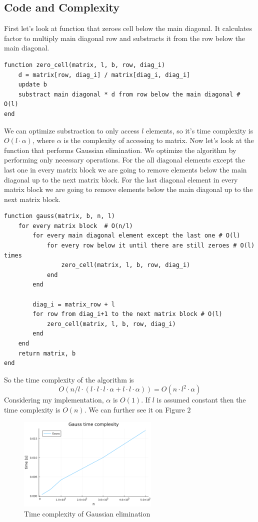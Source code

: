\documentclass[11pt]{article}
\begin{document}
\subsection*{Code and Complexity} 
First let's look at function that zeroes cell below the main diagonal.
It calculates factor to multiply main diagonal row and substracts it from the row below the main diagonal.
\begin{lstlisting}
function zero_cell(matrix, l, b, row, diag_i)
    d = matrix[row, diag_i] / matrix[diag_i, diag_i]
    update b
    substract main diagonal * d from row below the main diagonal # O(l)
end
\end{lstlisting}
We can optimize substraction to only access $l$ elements, so it's time complexity is $O(l \cdot \alpha)$, where $\alpha$ is the complexity of accessing to matrix.
\newline
Now let's look at the function that performs Gaussian elimination.
We optimize the algorithm by performing only necessary operations. 
For the all diagonal elements except the last one in every matrix block we are going to remove elements below the main diagonal up to the next matrix block.
For the last diagonal element in every matrix block we are going to remove elements below the main diagonal up to the next matrix block.
\begin{lstlisting}
function gauss(matrix, b, n, l)
    for every matrix block  # O(n/l)
        for every main diagonal element except the last one # O(l)
            for every row below it until there are still zeroes # O(l) times
                zero_cell(matrix, l, b, row, diag_i) 
            end
        end

        diag_i = matrix_row + l
        for row from diag_i+1 to the next matrix block # O(l)
            zero_cell(matrix, l, b, row, diag_i) 
        end
    end
    return matrix, b
end
\end{lstlisting}
So the time complexity of the algorithm is 
$$O(n/l \cdot ( l \cdot l \cdot l \cdot \alpha + l \cdot l \cdot \alpha )) = O(n \cdot l^2 \cdot \alpha )$$
Considering my implementation, $\alpha$ is $O(1)$.
If $l$ is assumed constant then the time complexity is $O(n)$. We can further see it on Figure $2$
\begin{figure}[h]
    \centering
    \includegraphics[width=0.6\textwidth]{gauss_time_complexity.png}
    \caption{Time complexity of Gaussian elimination}
\end{figure}
\end{document}
